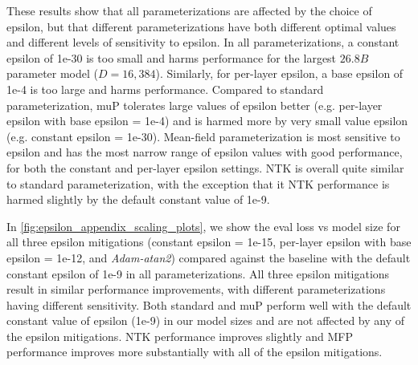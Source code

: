 \documentclass{article}
\theoremstyle{plain}
\theoremstyle{definition}
\theoremstyle{remark}
\begin{document}
These results show that all parameterizations are affected by the choice of epsilon, but that different parameterizations have both different optimal values and different levels of sensitivity to epsilon. In all parameterizations, a constant epsilon of 1e-30 is too small and harms performance for the largest $26.8B$ parameter model ($D = 16{,}384$). Similarly, for per-layer epsilon, a base epsilon of 1e-4 is too large and harms performance. Compared to standard parameterization, muP tolerates large values of epsilon better (e.g. per-layer epsilon with base epsilon = 1e-4) and is harmed more by very small value epsilon (e.g. constant epsilon = 1e-30). Mean-field parameterization is most sensitive to epsilon and has the most narrow range of epsilon values with good performance, for both the constant and per-layer epsilon settings. NTK is overall quite similar to standard parameterization, with the exception that it NTK performance is harmed slightly by the default constant value of 1e-9.

In \cref{fig:epsilon_appendix_scaling_plots}, we show the eval loss vs model size for all three epsilon mitigations (constant epsilon = 1e-15, per-layer epsilon with base epsilon = 1e-12, and \emph{Adam-atan2}) compared against the baseline with the default constant epsilon of 1e-9 in all parameterizations. All three epsilon mitigations result in similar performance improvements, with different parameterizations having different sensitivity. Both standard and muP perform well with the default constant value of epsilon (1e-9) in our model sizes and are not affected by any of the epsilon mitigations. NTK performance improves slightly and MFP performance improves more substantially with all of the epsilon mitigations.
\end{document}
